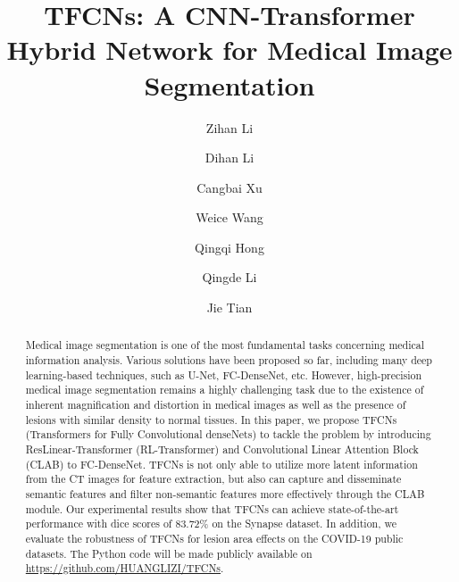 \documentclass[runningheads]{llncs}
\begin{document}
\title{TFCNs: A CNN-Transformer Hybrid Network for Medical Image Segmentation}

\author{Zihan Li \and
Dihan Li \and
Cangbai Xu \and Weice Wang \and Qingqi Hong \and Qingde Li \and Jie Tian}

\renewcommand{\thefootnote}{\fnsymbol{footnote}}


\maketitle              \begin{abstract}
Medical image segmentation is one of the most fundamental tasks concerning medical information analysis. Various solutions have been proposed so far, including many deep learning-based techniques, such as U-Net, FC-DenseNet, etc. However, high-precision medical image segmentation remains a highly challenging task due to the existence of inherent magnification and distortion in medical images as well as the presence of lesions with similar density to normal tissues. In this paper, we propose TFCNs (Transformers for Fully Convolutional denseNets) to tackle the problem by introducing ResLinear-Transformer (RL-Transformer) and Convolutional Linear Attention Block (CLAB) to FC-DenseNet. TFCNs is not only able to utilize more latent information from the CT images for feature extraction, but also can capture and disseminate semantic features and filter non-semantic features more effectively through the CLAB module. Our experimental results show that TFCNs can achieve state-of-the-art performance with dice scores of 83.72\% on the Synapse dataset. In addition, we evaluate the robustness of TFCNs for lesion area effects on the COVID-19 public datasets. The Python code will be made publicly available on \url{https://github.com/HUANGLIZI/TFCNs}.
\end{abstract}
\end{document}
